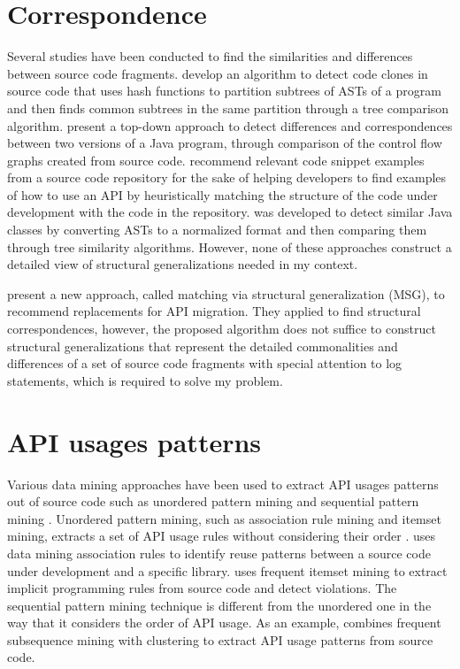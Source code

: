 \section{Correspondence}  \label{ch7-corr}
Several studies have been conducted to find the similarities and differences between source code fragments. \citet{baxter1998clone} develop an algorithm to detect code clones in source code that uses hash functions to partition subtrees of ASTs of a program and then finds common subtrees in the same partition through a tree comparison algorithm. \citet{apiwattanapong2004differencing} present a top-down approach to detect differences and correspondences between two versions of a Java program, through comparison of the control flow graphs created from source code. \citet{2006:tse:holmes} recommend relevant code snippet examples from a source code repository for the sake of helping developers to find examples of how to use an API by heuristically matching the structure of the code under development with the code in the repository.  \cite{sager2006detecting} was developed to detect similar Java classes by converting ASTs to a normalized format and then comparing them through tree similarity algorithms. However, none of these approaches construct a detailed view of structural generalizations needed in my context.



\citet{2014:uofc:cossette} present a new approach, called matching via structural generalization (MSG), to recommend replacements for API migration. They applied  to find structural correspondences, however, the proposed algorithm does not suffice to construct structural generalizations that represent the detailed commonalities and differences of a set of source code fragments with special attention to log statements, which is required to solve my problem.

\section{API usages patterns}  \label{ch7-usage-patterns}
Various data mining approaches have been used to extract API usages patterns out of source code such as unordered pattern mining and sequential pattern mining \cite{robillard2013automated}. Unordered pattern mining, such as association rule mining and itemset mining, extracts a set of API usage rules without considering their order \cite{agrawal1994fast}.  \cite{2000:icse:michail} uses data mining association rules to identify reuse patterns between a source code under development and a specific library.  \cite{li2005pr} uses frequent itemset mining to extract implicit programming rules from source code and detect violations. The sequential pattern mining technique is different from the unordered one in the way that it considers the order of API usage. As an example,  \cite{2006:msr:xie} combines frequent subsequence mining with clustering to extract API usage patterns from source code.

